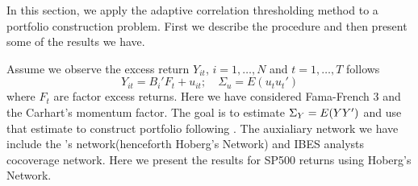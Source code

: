 In this section, we apply the adaptive correlation thresholding method to a portfolio construction problem. First we describe the procedure and then present some of the results we have. 

Assume we observe the excess return \(Y_{it}\), \(i = 1,\dots,N\) and \(t= 1,\dots, T\) follows
\begin{equation*}
    Y_{it} = B_{i}' F_{t} + u_{it} ; \quad \Sigma_{u} = E(u_{t}u_{t}')
\end{equation*}
where \(F_{t}\) are factor excess returns. Here we have considered Fama-French 3 and the Carhart's momentum factor. The goal is to estimate \(\Sigma_{Y} = E\pqty{YY'}\) and use that estimate to construct portfolio following \cite{ledoit2017NonlinearShrinkage}. The auxialiary network we have include the \cite{hoberg2016TextBasedNetwork}'s network(henceforth Hoberg's Network) and IBES analysts cocoverage network. Here we present the results for SP500 returns using Hoberg's Network. 

